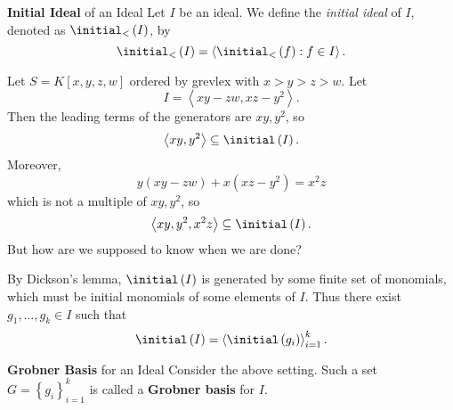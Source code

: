 \documentclass[co439]{subfiles}
\begin{document}
    \begin{definition}{\textbf{Initial Ideal} of an Ideal}
        Let $I$ be an ideal. We define the \emph{initial ideal} of $I$, denoted as $\initial_<\left( I \right)$, by
        \begin{equation*}
            \initial_<\left( I \right) = \left< \initial_<\left( f \right):f\in I \right>. 
        \end{equation*}
    \end{definition}
    
    \begin{example}{}
        Let $S=K\left[ x,y,z,w \right]$ ordered by grevlex with $x>y>z>w$. Let
        \begin{equation*}
            I = \left< xy-zw, xz-y^{2} \right>. 
        \end{equation*}
        Then the leading terms of the generators are $xy, y^{2}$, so
        \begin{equation*}
            \left< xy,y^{2} \right>\subseteq\initial\left( I \right). 
        \end{equation*}
        Moreover,
        \begin{equation*}
            y\left( xy-zw \right) + x\left( xz-y^{2} \right) = x^{2}z
        \end{equation*}
        which is not a multiple of $xy,y^{2}$, so
        \begin{equation*}
            \left< xy,y^{2},x^{2}z \right>\subseteq\initial\left( I \right) .
        \end{equation*}
        But how are we supposed to know when we are done?
    \end{example}
    
    \rruleline

    \np By Dickson's lemma, $\initial\left( I \right)$ is generated by some finite set of monomials, which must be initial monomials of some elements of $I$. Thus there exist $g_1,\ldots,g_k\in I$ such that
    \begin{equation*}
        \initial\left( I \right) = \left< \initial\left( g_i \right) \right>^k_{i=1}. 
    \end{equation*}

    \begin{definition}{\textbf{Grobner Basis} for an Ideal}
        Consider the above setting. Such a set $G = \left\lbrace g_i \right\rbrace^{k}_{i=1}$ is called a \textbf{Grobner basis} for $I$.
    \end{definition}
    
\end{document}
